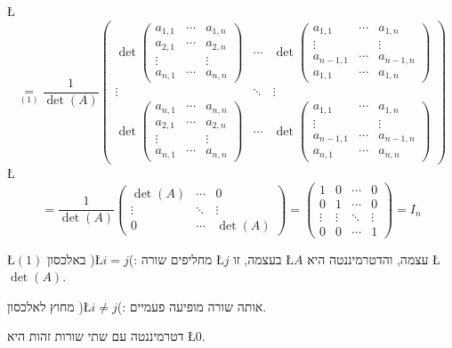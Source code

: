 \documentclass[english,hebrew]{article}
\begin{document}
\L{%
\[
\underset{(1)}{=}\frac{1}{\det(A)}\begin{pmatrix}\det\begin{pmatrix}a_{1,1} & \cdots & a_{1,n}\\
a_{2,1} & \cdots & a_{2,n}\\
\vdots &  & \vdots\\
a_{n,1} & \cdots & a_{n,n}
\end{pmatrix} & \cdots & \det\begin{pmatrix}a_{1,1} & \cdots & a_{1,n}\\
\vdots &  & \vdots\\
a_{n-1,1} & \cdots & a_{n-1,n}\\
a_{1,1} & \cdots & a_{1,n}
\end{pmatrix}\\
\vdots & \ddots & \vdots\\
\det\begin{pmatrix}a_{n,1} & \cdots & a_{n,n}\\
a_{2,1} & \cdots & a_{2,n}\\
\vdots &  & \vdots\\
a_{n,1} & \cdots & a_{n,n}
\end{pmatrix} & \cdots & \det\begin{pmatrix}a_{1,1} & \cdots & a_{1,n}\\
\vdots &  & \vdots\\
a_{n-1,1} & \cdots & a_{n-1,n}\\
a_{n,1} & \cdots & a_{n,n}
\end{pmatrix}
\end{pmatrix}
\]
}%
\L{%
\[
=\frac{1}{\det(A)}\begin{pmatrix}\det(A) & \cdots & 0\\
\vdots & \ddots & \vdots\\
0 & \cdots & \det(A)
\end{pmatrix}=\begin{pmatrix}1 & 0 & \cdots & 0\\
0 & 1 & \cdots & 0\\
\vdots & \vdots & \ddots & \vdots\\
0 & 0 & \cdots & 1
\end{pmatrix}=I_{n}
\]
}%

\L{$(1)$} באלכסון )\L{$i=j$}(: מחליפים שורה \L{$j$} בעצמה, זו \L{$A$}
עצמה, והדטרמיננטה היא \L{$\det(A)$}.

מחוץ לאלכסון )\L{$i\ne j$}(: אותה שורה מופיעה פעמיים.

דטרמיננטה עם שתי שורות זהות היא \L{$0$}.\\
\end{document}
